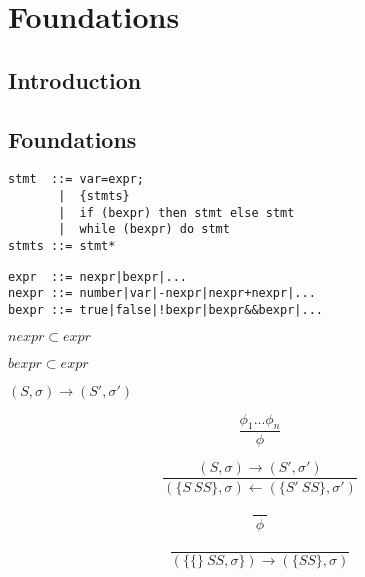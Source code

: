 \documentclass[12pt, a4paper]{book}
\begin{document}
  \chapter{Foundations}
  \label{chap:Foundations}

  \section{Introduction}
  \label{sec:Introduction}
  \section{Foundations}
  \label{sec:Foundations}

\begin{lstlisting}
stmt  ::= var=expr;
       |  {stmts}
       |  if (bexpr) then stmt else stmt
       |  while (bexpr) do stmt
stmts ::= stmt*
\end{lstlisting}

\begin{verbatim}
expr  ::= nexpr|bexpr|...
nexpr ::= number|var|-nexpr|nexpr+nexpr|...
bexpr ::= true|false|!bexpr|bexpr&&bexpr|...
\end{verbatim}

$nexpr \subset expr$

$bexpr \subset expr$

$(S,\sigma) \longrightarrow (S',\sigma')$

$$\frac{\phi_{1} ... \phi_{n}}{\phi}$$

$$
\frac{(S,\sigma) \longrightarrow (S', \sigma')}
{(\{S\ SS\},\sigma) \longleftarrow (\{S'\ SS\}, \sigma')}
$$

$$
\frac{}
{\ \phi \ }
$$

$$
\frac{}
{(\{ \{ \} \ SS, \sigma \}) \longrightarrow (\{ SS \}, \sigma)}
$$
\end{document}
